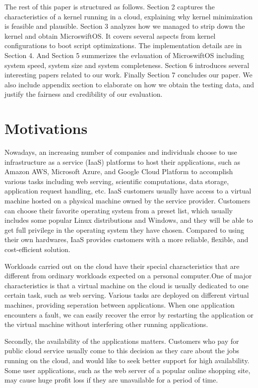 The rest of this paper is structured as follows. Section 2 captures the characteristics of a kernel running in a cloud, explaining why kernel minimization is feasible and plausible. Section 3 analyzes how we managed to strip down the kernel and obtain MicroswiftOS. It covers several aspects from kernel configurations to boot script optimizations. The implementation details are in Section 4. And Section 5 summerizes the evlauation of MicroswiftOS including system speed, system size and system completeness. Section 6 introduces several interesting papers related to our work. Finally Section 7 concludes our paper. We also include appendix section to elaborate on how we obtain the testing data, and justify the fairness and credibility of our evaluation.

\section{Motivations}
\label{sec:moti}

Nowadays, an increasing number of companies and individuals choose to use infrastructure as a service (IaaS) platforms to host their applications, such as Amazon AWS, Microsoft Azure, and Google Cloud Platform to accomplish various tasks including web serving, scientific computations, data storage, application request handling, etc.
IaaS customers usually have access to a virtual machine hosted on a physical machine owned by the service provider. Customers can choose their favorite operating system from a preset list, which usually includes some popular Linux distributions and Windows, and they will be able to get full privilege in the operating system they have chosen. Compared to using their own hardwares, IaaS provides customers with a more reliable, flexible, and cost-efficient solution.

Workloads carried out on the cloud have their special characteristics that are different from ordinary workloads expected on a personal computer.One of major characteristics is that a virtual machine on the cloud is usually dedicated to one certain task, such as web serving. Various tasks are deployed on different virtual machines, providing seperation between applications. When one application encounters a fault, we can easily recover the error by restarting the application or the virtual machine without interfering other running applications.

Secondly, the availability of the applications matters. Customers who pay for public cloud service usually come to this decision as they care about the jobs running on the cloud, and would like to seek better support for high availability. Some user applications, such as the web server of a popular online shopping site, may cause huge profit loss if they are unavailable for a period of time. 

